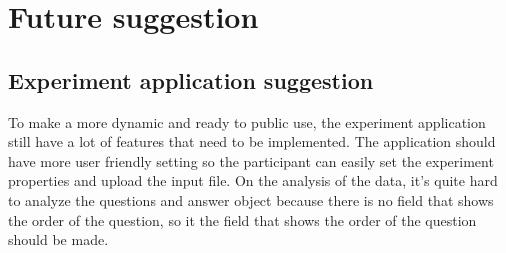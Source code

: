

\section{Future suggestion}

\subsection{Experiment application suggestion}

To make a more dynamic and ready to public use, the experiment application still have a lot of features that need to be implemented.
The application should have more user friendly setting so the participant can easily set the experiment properties and upload the input file.
On the analysis of the data, it's quite hard to analyze the questions and answer object because there is no field that shows the order of the question, so
it the field that shows the order of the question should be made.

